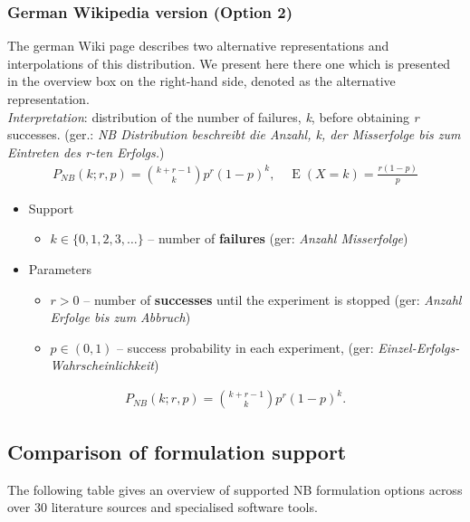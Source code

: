 \subsubsection*{German Wikipedia version (Option 2)}
The german Wiki page describes two alternative representations and interpolations
of this distribution. We present here there one which is presented in the overview 
box on the right-hand side, denoted as the alternative representation.\\
\textit{Interpretation}: distribution of the number of failures, \emph{k}, before obtaining \emph{r} successes. 
(ger.: \emph{NB Distribution beschreibt die Anzahl, k, der Misserfolge bis zum Eintreten des r-ten Erfolgs.})
\begin{align*}
P_{N\!B}(k;r,p) = {k + r - 1 \choose k} p^r (1-p)^k, \quad \operatorname E(X\!=\!k)=\frac{r(1-p)}{p}
\end{align*}
\begin{itemize}
\item 
Support
\begin{itemize}
\item 
$k \in \{ 0, 1, 2, 3, \dots\}$ -- number of \textbf{failures} (ger: \emph{Anzahl Misserfolge})
\end{itemize}
\item 
Parameters 
\begin{itemize}
\item 
$r > 0$ -- number of \textbf{successes} until the experiment is stopped (ger: \emph{Anzahl Erfolge bis zum Abbruch})
\item 
$p \in (0,1)$ -- success probability in each experiment, (ger: \emph{Einzel-Erfolgs-Wahrscheinlichkeit})
\end{itemize}
\end{itemize}
\begin{align*}
P_{N\!B}(k;r,p) = {k + r - 1 \choose k} p^r (1-p)^k  .
\end{align*}

\subsection{Comparison of formulation support}
\label{subsec:NB1implementations}
The following table gives an overview of supported NB formulation options 
across over 30 literature sources and specialised software tools. 

